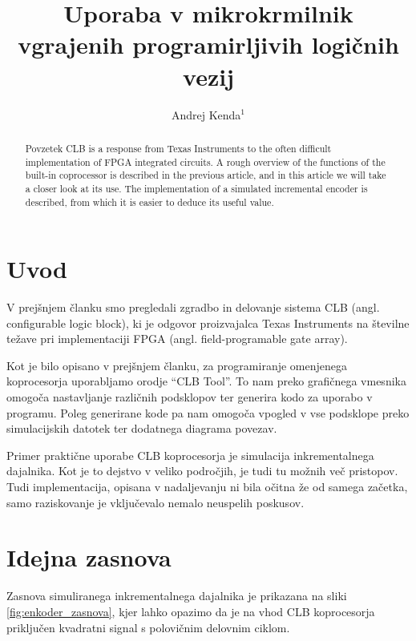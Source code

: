 \documentclass[a4paper]{article}
\begin{document}
\begin{sloppypar}
\title{Uporaba v mikrokrmilnik vgrajenih programirljivih logičnih vezij}

\author{Andrej Kenda$^{1}$}



\maketitle



\begin{abstract}{Povzetek}
CLB is a response from Texas Instruments to the often difficult implementation
of FPGA integrated circuits. A rough overview of the functions of the built-in
coprocessor is described in the previous article, and in this article we will
take a closer look at its use. The implementation of a simulated incremental
encoder is described, from which it is easier to deduce its useful value.
\end{abstract}




\section{Uvod}
V prejšnjem članku smo pregledali zgradbo in delovanje sistema CLB (angl.
configurable logic block), ki je odgovor proizvajalca Texas Instruments na
številne težave pri implementaciji FPGA (angl. field-programable gate array). 

Kot je bilo opisano v prejšnjem članku, za programiranje omenjenega
koprocesorja uporabljamo orodje ``CLB Tool''. To nam preko grafičnega vmesnika
omogoča nastavljanje različnih podsklopov ter generira kodo za uporabo v
programu. Poleg generirane kode pa nam omogoča vpogled v vse podsklope preko
simulacijskih datotek ter dodatnega diagrama povezav.

Primer praktične uporabe CLB koprocesorja je simulacija inkrementalnega
dajalnika. Kot je to dejstvo v veliko področjih, je tudi tu možnih več
pristopov. Tudi implementacija, opisana v nadaljevanju ni bila očitna že od
samega začetka, samo raziskovanje je vključevalo nemalo neuspelih poskusov.



\section{Idejna zasnova}
Zasnova simuliranega inkrementalnega dajalnika je prikazana na sliki
\ref{fig:enkoder_zasnova}, kjer lahko opazimo da je na vhod CLB koprocesorja
priključen kvadratni signal s polovičnim delovnim ciklom.


\end{sloppypar}
\end{document}
